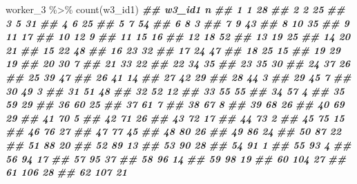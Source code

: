\documentclass[
]{book}
\newenvironment{Shaded}{\begin{snugshade}}{\end{snugshade}}
\newcommand{\DocumentationTok}[1]{\textcolor[rgb]{0.56,0.35,0.01}{\textbf{\textit{#1}}}}
\newcommand{\FunctionTok}[1]{\textcolor[rgb]{0.00,0.00,0.00}{#1}}
\newcommand{\NormalTok}[1]{#1}
\newcommand{\SpecialCharTok}[1]{\textcolor[rgb]{0.00,0.00,0.00}{#1}}
\theoremstyle{definition}
\theoremstyle{definition}
\theoremstyle{definition}
\theoremstyle{definition}
\theoremstyle{remark}
\begin{document}
\begin{Shaded}
\begin{Highlighting}[]
\NormalTok{worker\_3 }\SpecialCharTok{\%\textgreater{}\%} 
  \FunctionTok{count}\NormalTok{(w3\_id1)}
\DocumentationTok{\#\#     w3\_id1  n}
\DocumentationTok{\#\# 1        1 28}
\DocumentationTok{\#\# 2        2 25}
\DocumentationTok{\#\# 3        5 31}
\DocumentationTok{\#\# 4        6 25}
\DocumentationTok{\#\# 5        7 54}
\DocumentationTok{\#\# 6        8  3}
\DocumentationTok{\#\# 7        9 43}
\DocumentationTok{\#\# 8       10 35}
\DocumentationTok{\#\# 9       11 17}
\DocumentationTok{\#\# 10      12  9}
\DocumentationTok{\#\# 11      15 16}
\DocumentationTok{\#\# 12      18 52}
\DocumentationTok{\#\# 13      19 25}
\DocumentationTok{\#\# 14      20 21}
\DocumentationTok{\#\# 15      22 48}
\DocumentationTok{\#\# 16      23 32}
\DocumentationTok{\#\# 17      24 47}
\DocumentationTok{\#\# 18      25 15}
\DocumentationTok{\#\# 19      29 19}
\DocumentationTok{\#\# 20      30  7}
\DocumentationTok{\#\# 21      33 22}
\DocumentationTok{\#\# 22      34 35}
\DocumentationTok{\#\# 23      35 30}
\DocumentationTok{\#\# 24      37 26}
\DocumentationTok{\#\# 25      39 47}
\DocumentationTok{\#\# 26      41 14}
\DocumentationTok{\#\# 27      42 29}
\DocumentationTok{\#\# 28      44  3}
\DocumentationTok{\#\# 29      45  7}
\DocumentationTok{\#\# 30      49  3}
\DocumentationTok{\#\# 31      51 48}
\DocumentationTok{\#\# 32      52 12}
\DocumentationTok{\#\# 33      55 55}
\DocumentationTok{\#\# 34      57  4}
\DocumentationTok{\#\# 35      59 29}
\DocumentationTok{\#\# 36      60 25}
\DocumentationTok{\#\# 37      61  7}
\DocumentationTok{\#\# 38      67  8}
\DocumentationTok{\#\# 39      68 26}
\DocumentationTok{\#\# 40      69 29}
\DocumentationTok{\#\# 41      70  5}
\DocumentationTok{\#\# 42      71 26}
\DocumentationTok{\#\# 43      72 17}
\DocumentationTok{\#\# 44      73  2}
\DocumentationTok{\#\# 45      75 15}
\DocumentationTok{\#\# 46      76 27}
\DocumentationTok{\#\# 47      77 45}
\DocumentationTok{\#\# 48      80 26}
\DocumentationTok{\#\# 49      86 24}
\DocumentationTok{\#\# 50      87 22}
\DocumentationTok{\#\# 51      88 20}
\DocumentationTok{\#\# 52      89 13}
\DocumentationTok{\#\# 53      90 28}
\DocumentationTok{\#\# 54      91  1}
\DocumentationTok{\#\# 55      93  4}
\DocumentationTok{\#\# 56      94 17}
\DocumentationTok{\#\# 57      95 37}
\DocumentationTok{\#\# 58      96 14}
\DocumentationTok{\#\# 59      98 19}
\DocumentationTok{\#\# 60     104 27}
\DocumentationTok{\#\# 61     106 28}
\DocumentationTok{\#\# 62     107 21}

\end{Highlighting}
\end{Shaded}
\end{document}
